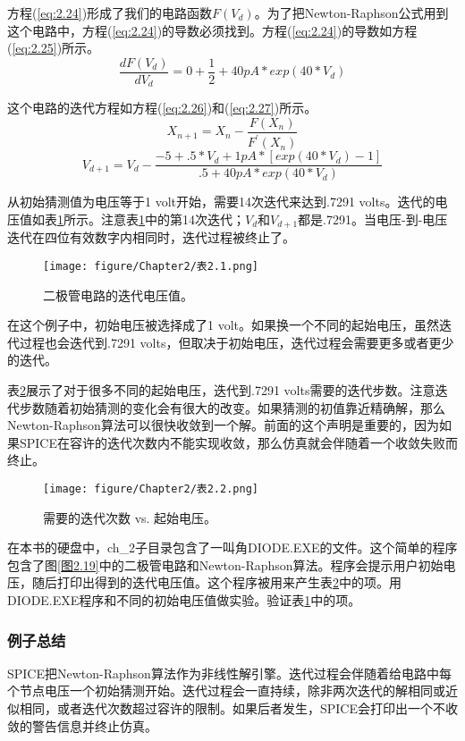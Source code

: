 方程(\ref{eq:2.24})形成了我们的电路函数$F(V_d)$。为了把Newton-Raphson公式用到这个电路中，方程(\ref{eq:2.24})的导数必须找到。方程(\ref{eq:2.24})的导数如方程(\ref{eq:2.25})所示。
\begin{equation}
    \frac{dF(V_d)}{dV_d} = 0 + \frac{1}{2} + 40pA * exp(40 * V_d)
    \label{eq:2.25}
\end{equation}

这个电路的迭代方程如方程(\ref{eq:2.26})和(\ref{eq:2.27})所示。
\begin{equation}
    X_{n+1} = X_n - \frac{F(X_n)}{F^{'}(X_n)}
    \label{eq:2.26}
\end{equation}
\begin{equation}
    V_{d+1} = V_d - \frac{-5+.5*V_d+1pA*[exp(40*V_d)-1]}{.5+40pA*exp(40*V_d)}
    \label{eq:2.27}
\end{equation}

从初始猜测值为电压等于1 volt开始，需要14次迭代来达到.7291 volts。迭代的电压值如表\ref{表2.1}所示。注意表\ref{表2.1}中的第14次迭代；$V_d$和$V_{d+1}$都是.7291。当电压-到-电压迭代在四位有效数字内相同时，迭代过程被终止了。
\begin{figure}[htbp]
\small
    \centering
    \texttt{[image: figure/Chapter2/表2.1.png]}
    \caption{二极管电路的迭代电压值。}
    \label{表2.1}
\end{figure}

在这个例子中，初始电压被选择成了1 volt。如果换一个不同的起始电压，虽然迭代过程也会迭代到.7291 volts，但取决于初始电压，迭代过程会需要更多或者更少的迭代。

表\ref{表2.2}展示了对于很多不同的起始电压，迭代到.7291 volts需要的迭代步数。注意迭代步数随着初始猜测的变化会有很大的改变。如果猜测的初值靠近精确解，那么Newton-Raphson算法可以很快收敛到一个解。前面的这个声明是重要的，因为如果SPICE在容许的迭代次数内不能实现收敛，那么仿真就会伴随着一个收敛失败而终止。
\begin{figure}[htbp]
\small
    \centering
    \texttt{[image: figure/Chapter2/表2.2.png]}
    \caption{需要的迭代次数 vs. 起始电压。}
    \label{表2.2}
\end{figure}

在本书的硬盘中，ch\_2子目录包含了一叫角DIODE.EXE的文件。这个简单的程序包含了图\ref{图2.19}中的二极管电路和Newton-Raphson算法。程序会提示用户初始电压，随后打印出得到的迭代电压值。这个程序被用来产生表\ref{表2.2}中的项。用DIODE.EXE程序和不同的初始电压值做实验。验证表\ref{表2.1}中的项。

\subsubsection{例子总结}
SPICE把Newton-Raphson算法作为非线性解引擎。迭代过程会伴随着给电路中每个节点电压一个初始猜测开始。迭代过程会一直持续，除非两次迭代的解相同或近似相同，或者迭代次数超过容许的限制。如果后者发生，SPICE会打印出一个不收敛的警告信息并终止仿真。

